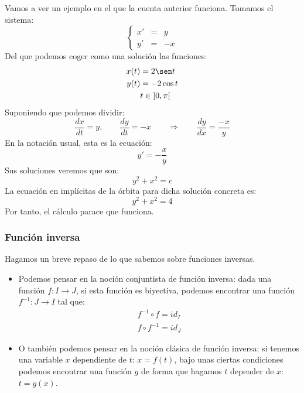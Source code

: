 \begin{ejemplo}
    Vamos a ver un ejemplo en el que la cuenta anterior funciona. Tomamos el sistema:
    \begin{equation*}
        \left\{\begin{array}{rcl}
                x' &=& y \\
                y' &=& -x
        \end{array}\right.
    \end{equation*}
    Del que podemos coger como una solución las funciones:
    \begin{align*}
        x(t) &= 2\sen t \\
        y(t) &= -2\cos t \\
             & t\in \left]0,\pi\right[
    \end{align*}
    Suponiendo que podemos dividir:
    \begin{equation*}
        \dfrac{dx}{dt} = y,\qquad \dfrac{dy}{dt} = -x \qquad \Longrightarrow  \qquad \dfrac{dy}{dx} = \dfrac{-x}{y}
    \end{equation*}
    En la notación usual, esta es la ecuación:
    \begin{equation*}
        y' = -\dfrac{x}{y}
    \end{equation*}
    Sus soluciones veremos que son:
    \begin{equation*}
        y^2 + x^2 = c
    \end{equation*}
    La ecuación en implícitas de la órbita para dicha solución concreta es:
    \begin{equation*}
        y^2 + x^2 = 4
    \end{equation*}
    Por tanto, el cálculo parace que funciona.
\end{ejemplo}

\subsubsection{Función inversa}
Hagamos un breve repaso de lo que sabemos sobre funciones inversas. 
\begin{itemize}
    \item Podemos pensar en la noción conjuntista de función inversa: dada una función $f:I\rightarrow J$, si esta función es biyectiva, podemos encontrar una función ${f^{-1}:J\rightarrow I}$ tal que:
        \begin{gather*}
            f^{-1}\circ f = id_I \\
            f\circ f^{-1} = id_J
        \end{gather*}
    \item O también podemos pensar en la noción clásica de función inversa: si tenemos una variable $x$ dependiente de $t$: $x = f(t)$, bajo unas ciertas condiciones podemos encontrar una función $g$ de forma que hagamos $t$ depender de $x$: $t = g(x)$.
\end{itemize}

